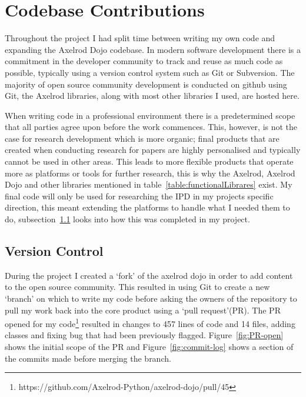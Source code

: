 \section{Codebase Contributions}
Throughout the project I had split time between writing my own code and expanding the Axelrod Dojo codebase. 
In modern software development there is a commitment in the developer community to track and reuse as much code as possible, typically using a version control system such as Git or Subversion.
The majority of open source community development is conducted on github\cite{GitHub} using Git, the Axelrod libraries, along with most other libraries I used, are hosted here.

When writing code in a professional environment there is a predetermined scope that all parties agree upon before the work commences.  This, however, is not the case for research development which is more organic;
final products that are created when conducting research for papers are highly personalised and typically cannot be used in other areas.
This leads to more flexible products that operate more as platforms or tools for further research, this is why the Axelrod, Axelrod Dojo and other libraries mentioned in table~\ref{table:functionalLibrares} exist.
My final code will only be used for researching the IPD in my projects specific direction, this meant extending the platforms to handle what I needed them to do, subsection~\ref{ssec:versioncontrol} looks into how this was completed in my project.

\subsection{Version Control}\label{ssec:versioncontrol}
During the project I created a `fork' of the axelrod dojo in order to add content to the open source community. 
This resulted in using Git to create a new `branch' on which to write my code before asking the owners of the repository to pull my work back into the core product using a `pull request'(PR).
The PR opened for my code\footnote{https://github.com/Axelrod-Python/axelrod-dojo/pull/45} resulted in changes to 457 lines of code and 14 files, adding classes and fixing bug that had been previously flagged.
Figure~\ref{fig:PR-open} shows the initial scope of the PR and Figure~\ref{fig:commit-log} shows a section of the commits made before merging the branch.

